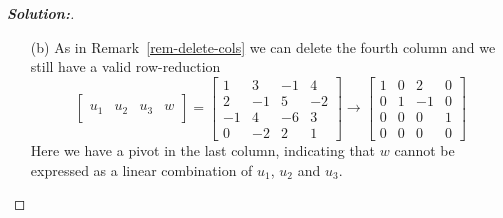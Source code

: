 \documentclass[a4paper]{amsart}
\theoremstyle{definition}
\newenvironment{solution}{\begin{proof}[\textbf{Solution:}] \vphantom{u}}{\end{proof}}
\begin{document}
\begin{solution}
\begin{itemize}
   column and we still have a valid row-reduction
   \[
     \left[\begin{array}{c|c|c|c}
      &&&\\u_1&u_2&u_3&v\\ &&&
     \end{array}\right]
     =
     \left[\begin{array}{cccc}
      1&3&-1&5\\2&-1&5&-4\\-1&4&-6&9\\0&-2&2&-4
     \end{array}\right]\\
     \to
     \left[\begin{array}{cccc}
      1&0&2&-1\\0&1&-1&2\\0&0&0&0\\0&0&0&0
     \end{array}\right]
   \]
   The matrix on the right is in RREF with no pivot in the last
   column, which means (by Method~\ref{meth-find-lincomb}) that $v$ is
   indeed a linear combination of $u_1,u_2$ and $u_3$.  More
   specifically, we see that the equation
   $\lm_1u_1+\lm_2u_2+\lm_3u_3=v$ is equivalent to the system of
   equations corresponding to the above matrix, namely
   \begin{align*}
    \lm_1 + 2\lm_3 &= -1 \\
    \lm_2-\lm_3 &= 2 \\
    0 &= 0 \\
    0 &= 0.
   \end{align*}
   The solution is $\lm_1=-1-2\lm_3$ and $\lm_2=2+\lm_3$ with $\lm_3$
   arbitrary.  We can take $\lm_3=0$ giving $\lm_1=-1$ and $\lm_2=2$,
   which means that $v=-u_1+2u_2$.
  \item[(b)] As in Remark~\ref{rem-delete-cols} we can delete the fourth
   column and we still have a valid row-reduction
   \[
     \left[\begin{array}{c|c|c|c}
      &&& \\ u_1&u_2&u_3&w \\ &&&
     \end{array}\right]
     =
     \left[\begin{array}{cccc}
      1&3&-1&4\\2&-1&5&-2\\-1&4&-6&3\\0&-2&2&1
     \end{array}\right]
     \to
     \left[\begin{array}{cccc}
      1&0&2&0\\0&1&-1&0\\0&0&0&1\\0&0&0&0
     \end{array}\right]
   \]
   Here we have a pivot in the last column, indicating that $w$ cannot
   be expressed as a linear combination of $u_1$, $u_2$ and $u_3$.
 \end{itemize}
\end{solution}
\end{document}
